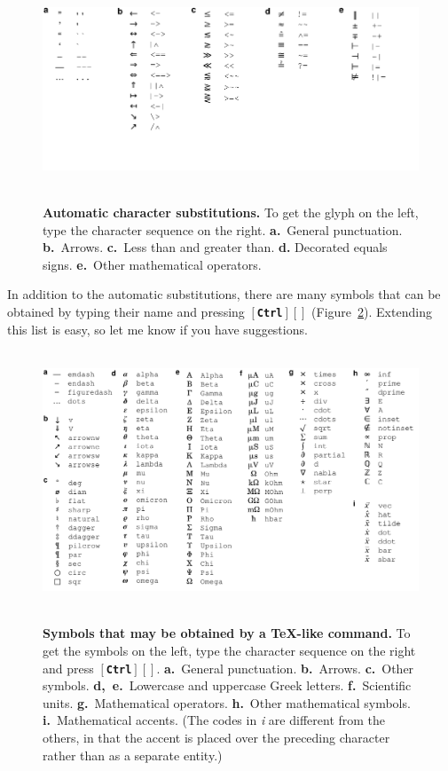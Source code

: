 \documentclass[11pt]{report}
\def\keystroke#1{$\left[\right.\!${\tt\bfseries #1}$\!\left.\right]$}
\def\keycombo#1#2{\keystroke{#1}\keystroke{#2}}
\def\keycontrol#1{\keycombo{Ctrl}{#1}}
\def\keyctrlbackslash{\keycontrol{\char92}}
\begin{document}
\begin{figure}[b]
\noindent~\hfill\includegraphics[scale=.85]{../doc/digraphs.pdf}\hfill~\vspace{-40pt}

\caption{{\bf Automatic character substitutions.} To get the glyph on the left, type the character
  sequence on the right. {\bf a.}~General punctuation. {\bf
    b.}~Arrows. {\bf c.}~Less than and greater than. {\bf d.} Decorated
  equals signs. {\bf e.}~Other mathematical operators.}\label{fig:charsubst}
\end{figure}

In addition to the automatic substitutions, there are many symbols
that can be obtained by typing their name and pressing
\keyctrlbackslash{} (Figure~\ref{fig:texcodes}).
Extending this list is easy, so let me know if you have suggestions.

\begin{figure}
\noindent~\hfill\includegraphics[scale=.85]{../doc/texcodes.pdf}\hfill~\vspace{-7pt}

\caption{{\bf Symbols that may be obtained by a TeX-like
  command.} To get the symbols on the left, type the character
  sequence on the right and press \keyctrlbackslash. 
{\bf a.}~General punctuation. {\bf b.}~Arrows. {\bf c.}~Other
symbols. {\bf d,~e.}~Lowercase and uppercase Greek letters. {\bf
  f.}~Scientific units. {\bf g.}~Mathematical operators. {\bf h.}~Other
mathematical symbols. {\bf i.}~Mathematical accents. (The codes in
\emph{i} are different from the others, in that the accent is placed
over the preceding character rather than as a separate entity.)}\label{fig:texcodes}
\end{figure}
\end{document}
